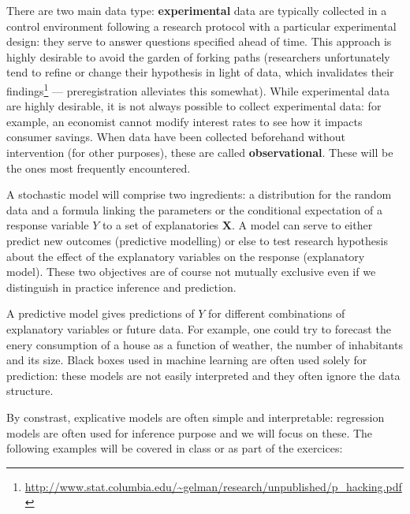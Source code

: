 \documentclass[
  11pt,
  letterpaper,
]{book}
\renewcommand{\href}[2]{#2\footnote{\url{#1}}}
\theoremstyle{definition}
\theoremstyle{definition}
\theoremstyle{definition}
\theoremstyle{definition}
\theoremstyle{remark}
\begin{document}
There are two main data type: \textbf{experimental} data are typically collected in a control environment following a research protocol with a particular experimental design: they serve to answer questions specified ahead of time. This approach is highly desirable to avoid the garden of forking paths \href{http://www.stat.columbia.edu/~gelman/research/unpublished/p_hacking.pdf}{(researchers unfortunately tend to refine or change their hypothesis in light of data, which invalidates their findings} --- preregistration alleviates this somewhat). While experimental data are highly desirable, it is not always possible to collect experimental data: for example, an economist cannot modify interest rates to see how it impacts consumer savings. When data have been collected beforehand without intervention (for other purposes), these are called \textbf{observational}. These will be the ones most frequently encountered.

A stochastic model will comprise two ingredients: a distribution for the random data and a formula linking the parameters or the conditional expectation of a response variable \(Y\) to a set of explanatories \(\mathbf{X}\). A model can serve to either predict new outcomes (predictive modelling) or else to test research hypothesis about the effect of the explanatory variables on the response (explanatory model). These two objectives are of course not mutually exclusive even if we distinguish in practice inference and prediction.

A predictive model gives predictions of \(Y\) for different combinations of explanatory variables or future data. For example, one could try to forecast the enery consumption of a house as a function of weather, the number of inhabitants and its size. Black boxes used in machine learning are often used solely for prediction: these models are not easily interpreted and they often ignore the data structure.

By constrast, explicative models are often simple and interpretable: regression models are often used for inference purpose and we will focus on these. The following examples will be covered in class or as part of the exercices:
\end{document}
